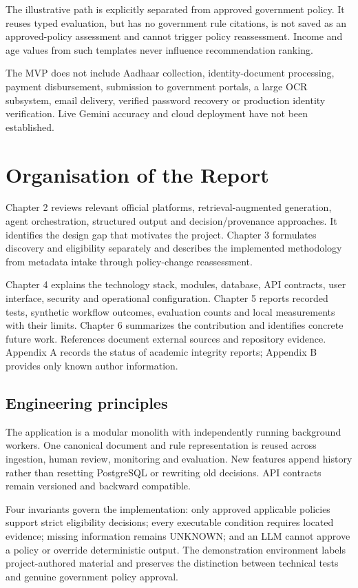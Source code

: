 \documentclass[12pt,a4paper,twoside]{report}
\begin{document}
The illustrative path is explicitly separated from approved government policy. It reuses typed evaluation, but has no government rule citations, is not saved as an approved-policy assessment and cannot trigger policy reassessment. Income and age values from such templates never influence recommendation ranking.

The MVP does not include Aadhaar collection, identity-document processing, payment disbursement, submission to government portals, a large OCR subsystem, email delivery, verified password recovery or production identity verification. Live Gemini accuracy and cloud deployment have not been established.

\section{Organisation of the Report}

Chapter 2 reviews relevant official platforms, retrieval-augmented generation, agent orchestration, structured output and decision/provenance approaches. It identifies the design gap that motivates the project. Chapter 3 formulates discovery and eligibility separately and describes the implemented methodology from metadata intake through policy-change reassessment.

Chapter 4 explains the technology stack, modules, database, API contracts, user interface, security and operational configuration. Chapter 5 reports recorded tests, synthetic workflow outcomes, evaluation counts and local measurements with their limits. Chapter 6 summarizes the contribution and identifies concrete future work. References document external sources and repository evidence. Appendix A records the status of academic integrity reports; Appendix B provides only known author information.

\subsection*{Engineering principles}

The application is a modular monolith with independently running background workers. One canonical document and rule representation is reused across ingestion, human review, monitoring and evaluation. New features append history rather than resetting PostgreSQL or rewriting old decisions. API contracts remain versioned and backward compatible.

Four invariants govern the implementation: only approved applicable policies support strict eligibility decisions; every executable condition requires located evidence; missing information remains UNKNOWN; and an LLM cannot approve a policy or override deterministic output. The demonstration environment labels project-authored material and preserves the distinction between technical tests and genuine government policy approval.
\end{document}
